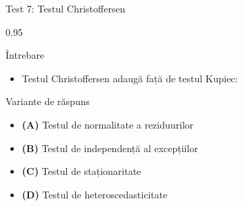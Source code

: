 \documentclass[9pt, aspectratio=169, t]{beamer}
\begin{document}
\begin{frame}{Test 7: Testul Christoffersen}
    \begin{cminipage}{0.95\textwidth}
    \begin{alertblock}{Întrebare}
        \begin{itemize}\setlength{\itemsep}{0pt}
            \item Testul Christoffersen adaugă față de testul Kupiec:
        \end{itemize}
    \end{alertblock}

    \begin{block}{Variante de răspuns}
    \begin{itemize}\setlength{\itemsep}{0pt}
        \item \textcolor{MainBlue}{\textbf{(A)}} Testul de normalitate a reziduurilor
        \item \textcolor{MainBlue}{\textbf{(B)}} Testul de independență al excepțiilor
        \item \textcolor{MainBlue}{\textbf{(C)}} Testul de staționaritate
        \item \textcolor{MainBlue}{\textbf{(D)}} Testul de heteroscedasticitate
    \end{itemize}
    \end{block}
    \end{cminipage}
\end{frame}
\end{document}
